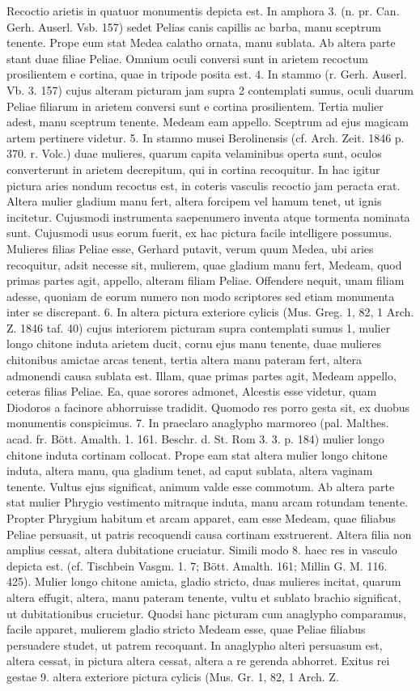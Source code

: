 \documentclass[a4paper, 11pt, oneside, polutonikogreek, german]{article}
\begin{document}
Recoctio arietis in quatuor monumentis depicta est. In amphora 3. (n. pr. Can. Gerh. Auserl. Vsb. 157) sedet Pelias canis capillis ac barba, manu sceptrum tenente. Prope eum stat Medea calatho ornata, manu sublata. Ab altera parte stant duae filiae Peliae. Omnium oculi conversi sunt in arietem recoctum prosilientem e cortina, quae in tripode posita est. 4. In stammo (r. Gerh. Auserl. Vb. 3. 157) cujus alteram picturam jam supra 2 contemplati sumus, oculi duarum Peliae filiarum in arietem conversi sunt e cortina prosilientem. Tertia mulier adest, manu sceptrum tenente. Medeam eam appello. Sceptrum ad ejus magicam artem pertinere videtur. 5. In stamno musei Berolinensis (cf. Arch. Zeit. 1846 p. 370. r. Volc.) duae mulieres, quarum capita velaminibus operta sunt, oculos converterunt in arietem decrepitum, qui in cortina recoquitur. In hac igitur pictura aries nondum recoctus est, in coteris vasculis recoctio jam peracta erat. Altera mulier gladium manu fert, altera forcipem vel hamum tenet, ut ignis incitetur. Cujusmodi instrumenta saepenumero inventa atque tormenta nominata sunt. Cujusmodi usus eorum fuerit, ex hac pictura facile intelligere possumus. Mulieres filias Peliae esse, Gerhard putavit, verum quum Medea, ubi aries recoquitur, adsit necesse sit, mulierem, quae gladium manu fert, Medeam, quod primas partes agit, appello, alteram filiam Peliae. Offendere nequit, unam filiam adesse, quoniam de eorum numero non modo scriptores sed etiam monumenta inter se discrepant. 6. In altera pictura exteriore cylicis (Mus. Greg. 1, 82, 1 Arch. Z. 1846 taf. 40) cujus interiorem picturam supra contemplati sumus 1, mulier longo chitone induta arietem ducit, cornu ejus manu tenente, duae mulieres chitonibus amictae arcas tenent, tertia altera manu pateram fert, altera admonendi causa sublata est. Illam, quae primas partes agit, Medeam appello, ceteras filias Peliae. Ea, quae sorores admonet, Alcestis esse videtur, quam Diodoros a facinore abhorruisse tradidit. Quomodo res porro gesta sit, ex duobus monumentis conspicimus. 7. In praeclaro anaglypho marmoreo (pal. Malthes. acad. fr. Bött. Amalth. 1. 161. Beschr. d. St. Rom 3. 3. p. 184) mulier longo chitone induta cortinam collocat. Prope eam stat altera mulier longo chitone induta, altera manu, qua gladium tenet, ad caput sublata, altera vaginam tenente. Vultus ejus significat, animum valde esse commotum. Ab altera parte stat mulier Phrygio vestimento mitraque induta, manu arcam rotundam tenente. Propter Phrygium habitum et arcam apparet, eam esse Medeam, quae filiabus Peliae persuasit, ut patris recoquendi causa cortinam exstruerent. Altera filia non amplius cessat, altera dubitatione cruciatur. Simili modo 8. haec res in vasculo depicta est. (cf. Tischbein Vasgm. 1. 7; Bött. Amalth. 161; Millin G. M. 116. 425). Mulier longo chitone amicta, gladio stricto, duas mulieres incitat, quarum altera effugit, altera, manu pateram tenente, vultu et sublato brachio significat, ut dubitationibus crucietur. Quodsi hanc picturam cum anaglypho comparamus, facile apparet, mulierem gladio stricto Medeam esse, quae Peliae filiabus persuadere studet, ut patrem recoquant. In anaglypho alteri persuasum est, altera cessat, in pictura altera cessat, altera a re gerenda abhorret. Exitus rei gestae 9. altera exteriore pictura cylicis (Mus. Gr. 1, 82, 1 Arch. Z. 
\end{document}
